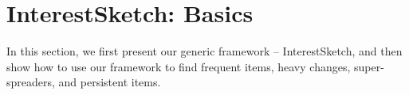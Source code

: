 \presec
\section{InterestSketch: Basics} \postsec
\label{sec:basicAlgorithm:frequent}

In this section, we first present our generic framework -- InterestSketch, and then show how to use our framework to find frequent items, heavy changes, super-spreaders, and persistent items.













%











